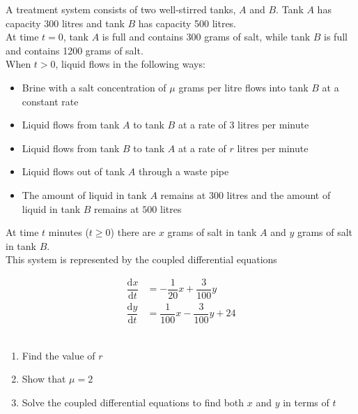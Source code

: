 \documentclass[leqno]{article}
\begin{document}
\begin{enumerate}[
  label=\textbf{\arabic*.},
  leftmargin=*,
  topsep=0pt,
  partopsep=0pt,
  parsep=0pt
]
\vspace*{10pt}

A treatment system consists of two well-stirred tanks, $A$ and $B$. Tank $A$ has capacity 300 litres and tank $B$ has capacity 500 litres. \\

At time $t=0$, tank $A$ is full and contains 300 grams of salt, while tank $B$ is full and contains 1200 grams of salt. \\

When $t>0$, liquid flows in the following ways: \\
\begin{itemize}
  \item Brine with a salt concentration of $\mu$ grams per litre flows into tank $B$ at a constant rate
  \item Liquid flows from tank $A$ to tank $B$ at a rate of $3$ litres per minute
  \item Liquid flows from tank $B$ to tank $A$ at a rate of $r$ litres per minute
  \item Liquid flows out of tank $A$ through a waste pipe
  \item The amount of liquid in tank $A$ remains at $300$ litres and the amount of liquid in tank $B$ remains at $500$ litres \\
\end{itemize}
At time $t$ minutes ($t\ge 0$) there are $x$ grams of salt in tank $A$ and $y$ grams of salt in tank $B$. \\

This system is represented by the coupled differential equations

\begin{align*}
\dfrac{\mathrm{d}x}{\mathrm{d}t} & =  -\dfrac{1}{20}x+\dfrac{3}{100}y\\[6pt]
\dfrac{\mathrm{d}y}{\mathrm{d}t} & =  \dfrac{1}{100}x-\dfrac{3}{100}y + 24
\end{align*}
\\
\begin{enumerate}[label=\textbf{(\alph*)}]
  \item Find the value of $r$  \\
  \item Show that $\mu=2$  \\
  \item Solve the coupled differential equations to find both $x$ and $y$ in terms of $t$  \\
\end{enumerate}


\end{enumerate}
\end{document}
